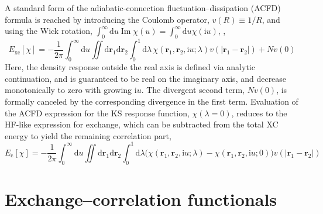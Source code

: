A standard form of the adiabatic-connection fluctuation--dissipation (ACFD) formula is reached by introducing the Coulomb operator, $v(R)\equiv1/R$, and using the Wick rotation, $\int_0^\infty\mathrm du\operatorname{Im}\chi(u)=\int_0^\infty\mathrm du\chi(\mathrm iu)$, \citep[see][eq.~123.20]{Landau80},
\begin{equation}
  E_\text{xc}[\chi]=-\frac1{2\pi}\int_0^\infty\mathrm du\iint\mathrm d\mathbf r_1\mathrm d\mathbf r_2\int_0^1\mathrm d\lambda\,\chi(\mathbf r_1,\mathbf r_2,\mathrm iu;\lambda)v(|\mathbf r_1-\mathbf r_2|)+Nv(0)
  \label{eq:acfd-xc}
\end{equation}
Here, the density response outside the real axis is defined via analytic continuation, and is guaranteed to be real on the imaginary axis, and decrease monotonically to zero with growing $\mathrm iu$.
The divergent second term, $Nv(0)$, is formally canceled by the corresponding divergence in the first term.
Evaluation of the ACFD expression for the KS response function, $\chi(\lambda=0)$, reduces to the HF-like expression for exchange, which can be subtracted from the total XC energy to yield the remaining correlation part,
\begin{equation}
  E_\text{c}[\chi]=-\frac1{2\pi}\int_0^\infty\mathrm du\iint\mathrm d\mathbf r_1\mathrm d\mathbf r_2\int_0^1\mathrm d\lambda\big(\chi(\mathbf r_1,\mathbf r_2,\mathrm iu;\lambda)-\chi(\mathbf r_1,\mathbf r_2,\mathrm iu;0)\!\big)v(|\mathbf r_1-\mathbf r_2|)
  \label{eq:acfd-c}
\end{equation}

\section{Exchange--correlation functionals}\label{sec:xc-func}

